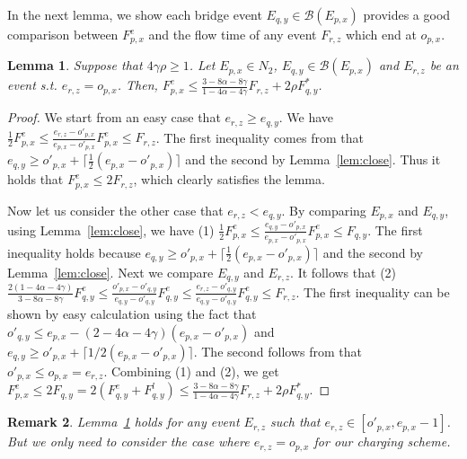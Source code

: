 \documentclass[11pt]{article}
\newtheorem{lemma}{Lemma}[section]
\newtheorem{remark}[lemma]{Remark}
\newcommand{\len}{\mathfrak{\rho}}
\newcommand{\fe}{F^e}
\newcommand{\fl}{F^l}
\begin{document}
\begin{titlepage}
In the next lemma, we show each bridge event $E_{q,y} \in \mathcal{B}(E_{p,x})$ provides a good comparison between
$\fe_{p,x}$ and the flow time of any event $F_{r,z}$ which end at $o_{p,x}$.

\begin{lemma}
  \label{lem:bdg} Suppose that $4 \gamma \len \geq 1$. Let $E_{p,x}
  \in N_2$, $E_{q,y} \in \mathcal{B}(E_{p,x})$ and $E_{r,z}$ be an
  event s.t. $e_{r,z} = o_{p,x}$.  Then, $\fe_{p,x} \leq \frac{3 -
    8\alpha - 8\gamma}{1 - 4\alpha - 4\gamma} F_{r,z} + 2 \len
  F^*_{q,y}$.
\end{lemma}
\begin{proof}
  We start from an easy case that $e_{r,z} \geq e_{q,y}$. We have
  $\frac{1}{2}\fe_{p,x} \leq \frac{ e_{r,z} - o'_{p,x}}{e_{p,x} -
    o'_{p,x}} \fe_{p,x} \leq F_{r,z}$. The first inequality comes from
  that $e_{q,y} \geq o'_{p,x} + \lceil \frac{1}{2}(e_{p,x} - o'_{p,x}) \rceil$ and
  the second by Lemma~\ref{lem:close}. Thus it holds that $\fe_{p,x}
  \leq 2 F_{r,z}$, which clearly satisfies the lemma.

  Now let us consider the other case that $e_{r,z} < e_{q,y}$. By
  comparing $E_{p,x}$ and $E_{q,y}$, using Lemma~\ref{lem:close}, we
  have (1) $\frac{1}{2}\fe_{p,x} \leq \frac{ e_{q,y} -
    o'_{p,x}}{e_{p,x} - o'_{p,x}} \fe_{p,x} \leq F_{q,y}$. The first
  inequality holds because $e_{q,y} \geq o'_{p,x} + \lceil \frac{1}{2}(e_{p,x} -
  o'_{p,x}) \rceil$ and the second by Lemma~\ref{lem:close}. Next we compare $E_{q,y}$ and $E_{r,z}$. It follows that
  (2) $\frac{2(1-4\alpha - 4\gamma)}{3 - 8\alpha - 8\gamma} \fe_{q,y}
  \leq \frac{ o'_{p,x} - o'_{q,y}}{e_{q,y} - o'_{q,y}} \fe_{q,y} \leq
  \frac{ e_{r,z} - o'_{q,y}}{e_{q,y} - o'_{q,y}} \fe_{q,y} \leq
  F_{r,z}$. The first inequality can be shown by easy calculation
  using the fact that $o'_{q,y} \leq e_{p,x} - (2 -4\alpha -
  4\gamma)(e_{p,x} - o'_{p,x})$ and $e_{q,y} \geq o'_{p,x} + \lceil 1/2(e_{p,x} - o'_{p,x}) \rceil$.
  The second follows from that $o'_{p,x} \leq o_{p,x} =
  e_{r,z}$. Combining (1) and (2), we get $\fe_{p,x} \leq 2F_{q,y} = 2
  (\fe_{q,y} + \fl_{q,y}) \leq \frac{3 - 8\alpha - 8\gamma}{1 -
    4\alpha - 4\gamma} F_{r,z} + 2 \len F^*_{q,y}$.
\end{proof}

\begin{remark}
Lemma~\ref{lem:bdg} holds for any event $E_{r,z}$ such that $e_{r,z} \in [o'_{p,x}, e_{p,x} -1]$. But we only need to
consider the case where $e_{r,z} = o_{p,x}$ for our charging scheme.
\end{remark}



\end{titlepage}
\end{document}
